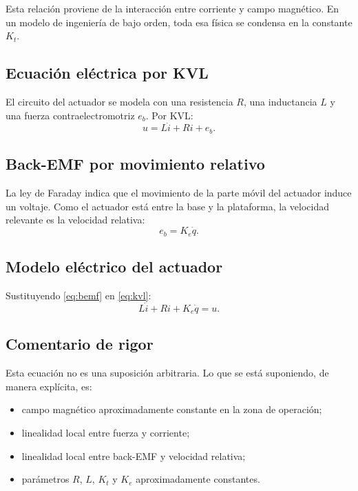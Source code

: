 \documentclass[11pt]{article}
\begin{document}
Esta relaci\'on proviene de la interacci\'on entre corriente y campo magn\'etico. En un modelo de ingenier\'ia de bajo orden, toda esa f\'isica se condensa en la constante $K_t$.

\subsection{Ecuaci\'on el\'ectrica por KVL}

El circuito del actuador se modela con una resistencia $R$, una inductancia $L$ y una fuerza contraelectromotriz $e_b$. Por KVL:
\begin{equation}
u = L\dot i + Ri + e_b.
\label{eq:kvl}
\end{equation}

\subsection{Back-EMF por movimiento relativo}

La ley de Faraday indica que el movimiento de la parte m\'ovil del actuador induce un voltaje. Como el actuador est\'a entre la base y la plataforma, la velocidad relevante es la velocidad relativa:
\begin{equation}
e_b = K_e \dot q.
\label{eq:bemf}
\end{equation}

\subsection{Modelo el\'ectrico del actuador}

Sustituyendo \eqref{eq:bemf} en \eqref{eq:kvl}:
\begin{equation}
L\dot i + Ri + K_e\dot q = u.
\label{eq:elec}
\end{equation}

\subsection{Comentario de rigor}

Esta ecuaci\'on no es una suposici\'on arbitraria. Lo que se est\'a suponiendo, de manera expl\'icita, es:

\begin{itemize}[leftmargin=1.2cm]
\item campo magn\'etico aproximadamente constante en la zona de operaci\'on;
\item linealidad local entre fuerza y corriente;
\item linealidad local entre back-EMF y velocidad relativa;
\item par\'ametros $R$, $L$, $K_t$ y $K_e$ aproximadamente constantes.
\end{itemize}
\end{document}
